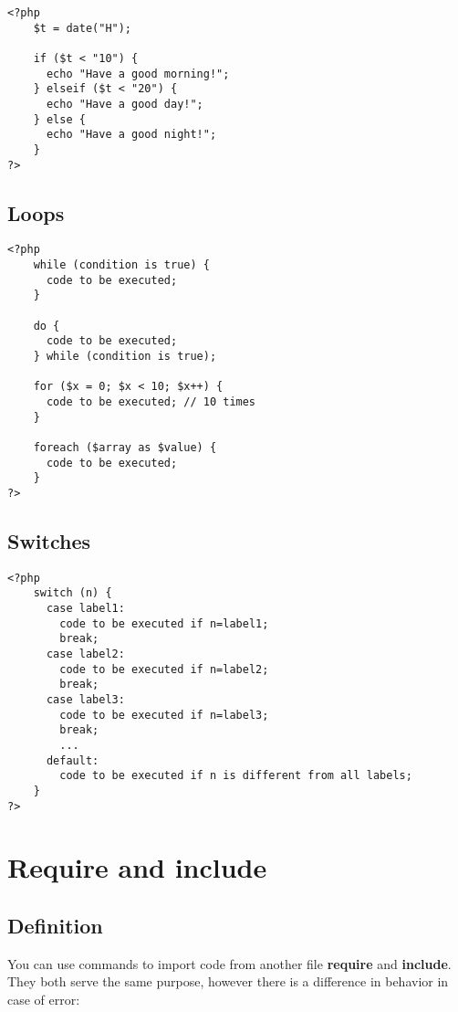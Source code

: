 \documentclass{article}
\begin{document}
\begin{lstlisting}
<?php
    $t = date("H");
    
    if ($t < "10") {
      echo "Have a good morning!";
    } elseif ($t < "20") {
      echo "Have a good day!";
    } else {
      echo "Have a good night!";
    }
?>
\end{lstlisting}

\subsection{Loops}

\begin{lstlisting}
<?php
    while (condition is true) {
      code to be executed;
    }
    
    do {
      code to be executed;
    } while (condition is true);
    
    for ($x = 0; $x < 10; $x++) {
      code to be executed; // 10 times
    }
    
    foreach ($array as $value) {
      code to be executed;
    }
?>
\end{lstlisting}

\subsection{Switches}

\begin{lstlisting}
<?php
    switch (n) {
      case label1:
        code to be executed if n=label1;
        break;
      case label2:
        code to be executed if n=label2;
        break;
      case label3:
        code to be executed if n=label3;
        break;
        ...
      default:
        code to be executed if n is different from all labels;
    }
?>
\end{lstlisting}

\pagebreak

\section{Require and include}

\subsection{Definition}

You can use commands to import code from another file
\textbf{require} and \textbf{include}. They both serve the same purpose, however
there is a difference in behavior in case of error:
\end{document}
